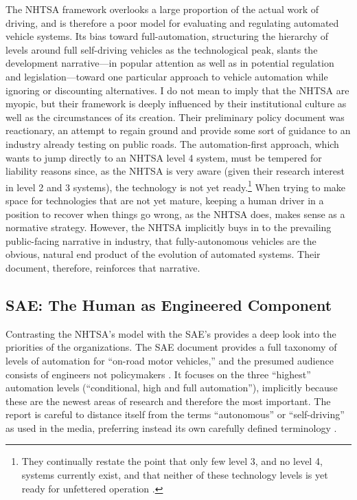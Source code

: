 The NHTSA framework overlooks a large proportion of the actual work of
driving, and is therefore a poor model for evaluating and
regulating automated vehicle systems. Its bias toward
full-automation, structuring the hierarchy of levels around full
self-driving vehicles as the technological peak, slants the
development narrative---in popular attention as well as in
potential regulation and legislation---toward one particular approach
to vehicle automation while ignoring or discounting alternatives. I do
not mean to imply that the NHTSA are myopic, but their framework is
deeply influenced by their institutional culture as well as the
circumstances of its creation. Their preliminary policy document was
reactionary, an attempt to regain ground and provide some sort of guidance to an
industry already testing on public roads. The automation-first
approach, which wants to jump directly to an NHTSA level 4 system,
must be tempered for liability reasons since, as the 
NHTSA is very aware (given their research interest in level 2 and 3
systems), the technology is not yet ready.\footnote{They continually
  restate the point that only few level 3, and no level 4, systems
  currently exist, and that neither of these technology levels is yet
  ready for unfettered operation \cite[p. 10, 14]{NHTSA}.} When trying to make space for
technologies that are not yet mature, keeping a human driver in a
position to recover when things go wrong, as the NHTSA does, makes sense as a normative
strategy. However, the NHTSA implicitly buys in to the prevailing
public-facing narrative in industry, that fully-autonomous vehicles
are the obvious, natural end product of the evolution of automated
systems. Their document, therefore, reinforces that narrative.

\subsection{SAE: The Human as Engineered Component}

Contrasting the NHTSA's model with the SAE's provides a deep look into
the priorities of the organizations. The SAE document provides a full
taxonomy of levels of automation for ``on-road motor vehicles,'' and the
presumed audience consists of engineers not policymakers \cite{SAE}. It
focuses on the three ``highest'' automation levels (``conditional, high
and full automation''), implicitly because these are the newest areas
of research and therefore the most important. The report is careful to
distance itself from the terms ``autonomous'' or ``self-driving'' as used
in the media, preferring instead its own carefully defined
terminology \cite[p. 5-6]{SAE}. 

